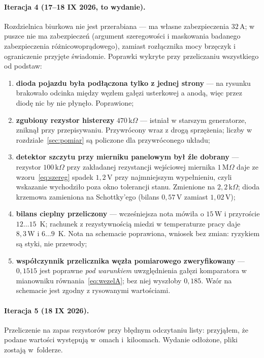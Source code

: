 \documentclass[a4paper,11pt]{article}
\newcommand{\kohm}{\,\mathrm{k}\Omega}
\newcommand{\Mohm}{\,\mathrm{M}\Omega}
\newcommand{\volt}{\,\mathrm{V}}
\newcommand{\amp}{\,\mathrm{A}}
\newcommand{\watt}{\,\mathrm{W}}
\begin{document}
\paragraph{Iteracja 4 (17--18 IX 2026, to wydanie).} Rozdzielnica biurkowa nie jest
przerabiana --- ma własne zabezpieczenia $32\amp$; w puszce nie ma zabezpieczeń
(argument szeregowości i maskowania badanego zabezpieczenia
różnicowoprądowego), zamiast rozłącznika mocy brzęczyk i ograniczenie przyjęte
świadomie. Poprawki wykryte przy przeliczaniu wszystkiego od podstaw:

\begin{enumerate}
\item \textbf{dioda pojazdu była podłączona tylko z jednej strony} --- na rysunku
      brakowało odcinka między węzłem gałęzi usterkowej a anodą, więc przez diodę
      nic by nie płynęło. Poprawione;
\item \textbf{zgubiony rezystor histerezy} $470\kohm$ --- istniał w starszym
      generatorze, zniknął przy przepisywaniu. Przywrócony wraz z drogą sprzężenia;
      liczby w rozdziale~\ref{sec:pomiar} są policzone dla przywróconego układu;
\item \textbf{detektor szczytu przy mierniku panelowym był źle dobrany} ---
      rezystor $100\kohm$ przy zakładanej rezystancji wejściowej miernika $1\Mohm$
      daje ze wzoru~\eqref{eq:szereg} spadek $1{,}2\volt$ przy najmniejszym
      wypełnieniu, czyli wskazanie wychodziło poza okno tolerancji stanu.
      Zmienione na $2{,}2\kohm$; dioda krzemowa zamieniona na Schottky'ego
      (bilans $0{,}57\volt$ zamiast $1{,}02\volt$);
\item \textbf{bilans cieplny przeliczony} --- wcześniejsza nota mówiła
      o $15\watt$ i przyroście $12\ldots15$~K; rachunek z rezystywnością miedzi
      w temperaturze pracy daje $8{,}3\watt$ i $6\ldots9$~K. Nota na schemacie
      poprawiona, wniosek bez zmian: ryzykiem są styki, nie przewody;
\item \textbf{współczynnik przelicznika węzła pomiarowego zweryfikowany} ---
      $0{,}1515$ jest poprawne \emph{pod warunkiem} uwzględnienia gałęzi
      komparatora w mianowniku równania~\eqref{eq:wezelA}; bez niej wyszłoby
      $0{,}185$. Wzór na schemacie jest zgodny z rysowanymi wartościami.
\end{enumerate}

\paragraph{Iteracja 5 (18 IX 2026).} Przeliczenie na zapas rezystorów przy błędnym
odczytaniu listy: przyjąłem, że podane wartości występują w~omach i~kiloomach.
Wydanie odłożone, pliki zostają w~folderze.
\end{document}

